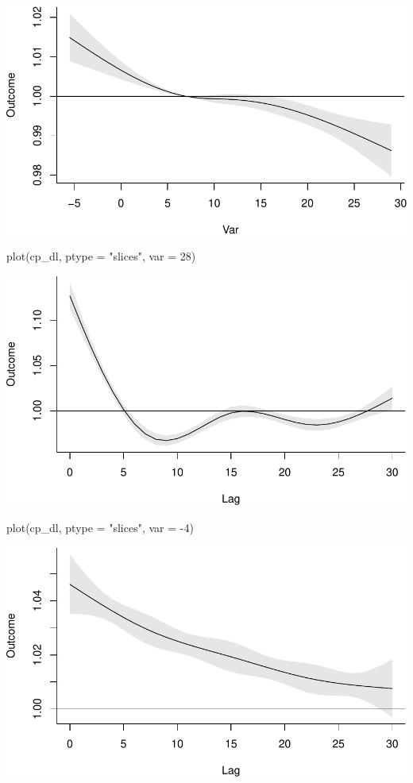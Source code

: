 \documentclass[
]{book}
\newenvironment{Shaded}{\begin{snugshade}}{\end{snugshade}}
\newcommand{\AttributeTok}[1]{\textcolor[rgb]{0.77,0.63,0.00}{#1}}
\newcommand{\DecValTok}[1]{\textcolor[rgb]{0.00,0.00,0.81}{#1}}
\newcommand{\FunctionTok}[1]{\textcolor[rgb]{0.00,0.00,0.00}{#1}}
\newcommand{\NormalTok}[1]{#1}
\newcommand{\SpecialCharTok}[1]{\textcolor[rgb]{0.00,0.00,0.00}{#1}}
\newcommand{\StringTok}[1]{\textcolor[rgb]{0.31,0.60,0.02}{#1}}
\begin{document}
\includegraphics{adv_epi_analysis_files/figure-latex/unnamed-chunk-104-2.pdf}

\begin{Shaded}
\begin{Highlighting}[]
\FunctionTok{plot}\NormalTok{(cp\_dl, }\AttributeTok{ptype =} \StringTok{"slices"}\NormalTok{, }\AttributeTok{var =} \DecValTok{28}\NormalTok{)}
\end{Highlighting}
\end{Shaded}

\includegraphics{adv_epi_analysis_files/figure-latex/unnamed-chunk-104-3.pdf}

\begin{Shaded}
\begin{Highlighting}[]
\FunctionTok{plot}\NormalTok{(cp\_dl, }\AttributeTok{ptype =} \StringTok{"slices"}\NormalTok{, }\AttributeTok{var =} \SpecialCharTok{{-}}\DecValTok{4}\NormalTok{)}
\end{Highlighting}
\end{Shaded}

\includegraphics{adv_epi_analysis_files/figure-latex/unnamed-chunk-104-4.pdf}
\end{document}
